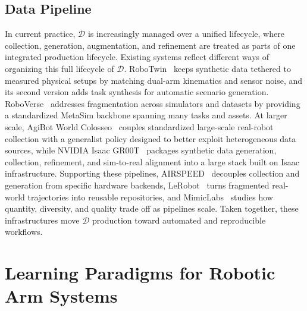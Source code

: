 \documentclass[acmsmall,screen,review]{acmart}
\begin{document}
\subsection{Data Pipeline}\label{sec:data_factories_robotic_arms}

In current practice, \(\mathcal{D}\) is increasingly managed over a unified lifecycle, where collection, generation, augmentation, and refinement are treated as parts of one integrated production lifecycle.
Existing systems reflect different ways of organizing this full lifecycle of \(\mathcal{D}\). 
RoboTwin~\cite{mu2025robotwin} keeps synthetic data tethered to measured physical setups by matching dual-arm kinematics and sensor noise, and its second version adds task synthesis for automatic scenario generation. 
RoboVerse~\cite{geng2025roboverse} addresses fragmentation across simulators and datasets by providing a standardized MetaSim backbone spanning many tasks and assets. 
At larger scale, AgiBot World Colosseo~\cite{agibot2025} couples standardized large-scale real-robot collection with a generalist policy designed to better exploit heterogeneous data sources,
while NVIDIA Isaac GR00T~\cite{nvidia_gr00t} packages synthetic data generation, collection, refinement, and sim-to-real alignment into a large stack built on Isaac infrastructure. 
Supporting these pipelines, AIRSPEED~\cite{xia2024airspeed} decouples collection and generation from specific hardware backends, 
LeRobot~\cite{lerobot2024} turns fragmented real-world trajectories into reusable repositories, 
and MimicLabs~\cite{saxena2025matters} studies how quantity, diversity, and quality trade off as pipelines scale.
Taken together, these infrastructures move \(\mathcal{D}\) production toward automated and reproducible workflows.

\section{Learning Paradigms for Robotic Arm Systems}\label{sec:embodiment_method}
\end{document}
